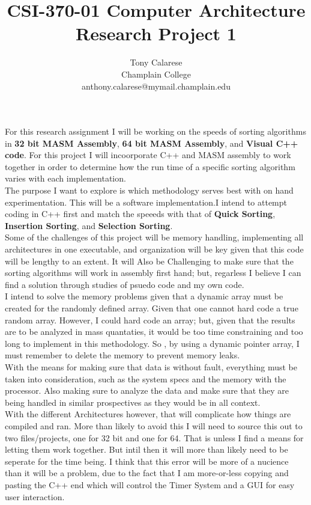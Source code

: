 \documentclass{article}
\author{ }
\date{ }
\title{CSI-370-01 Computer Architecture\cite{Hall} \cite{bibSource}  \\
 Research Project 1}
\author{Tony Calarese \\
Champlain College\\
anthony.calarese@mymail.champlain.edu}
\begin{document}
\maketitle

\indent For this research assignment I will be working on the speeds of sorting algorithms in \textbf{32 bit MASM Assembly}, \textbf{64 bit  MASM Assembly}, and \textbf{Visual C++ code}.
For this project I will incoorporate C++ and MASM assembly to work together in order to determine how the run time of a specific sorting algorithm varies with each implementation.
\\
 \indent The purpose I want to explore is which methodology serves best with on hand experimentation. This will be a software implementation.I intend to attempt coding in C++ first and match the speeeds with that of \textbf{Quick Sorting}, \textbf{Insertion Sorting}, and \textbf{Selection Sorting}.
\\
\indent Some of the challenges of this project will be memory handling, implementing all architectures in one executable, and organization will be key given that this code will be lengthy to an extent. It will Also be Challenging to make sure that the sorting algorithms will work in assembly first hand; but, regarless I believe I can find a solution through studies of psuedo code and my own code. 
\\
\indent I intend to solve the memory problems given that a dynamic array must be created for the randomly defined array. Given that one cannot hard code a true random array. However, I could hard code an array; but, given that the results are to be analyzed in mass quantaties, it would be too time constraining and too long to implement in this methodology. So , by using a dynamic pointer array, I must remember to delete the memory to prevent memory leaks.
\\
\indent With the means for making sure that data is without fault, everything must be taken into consideration, such as the system specs and the memory with the processor. Also making sure to analyze the data and make sure that they are being handled in similar prospectives as they would be in all context.
\\
\indent With the different Architectures however, that will complicate how things are compiled and ran. More than likely to avoid this I will need to source this out to two files/projects, one for 32 bit and one for 64. That is unless I find a means for letting them work together. But intil then it will more than likely need to be seperate for the time being. I think that this error will be more of a nucience than it will be a problem, due to the fact that I am more-or-less copying and pasting the C++ end which will control the Timer System and a GUI for easy user interaction.
\end{document}

